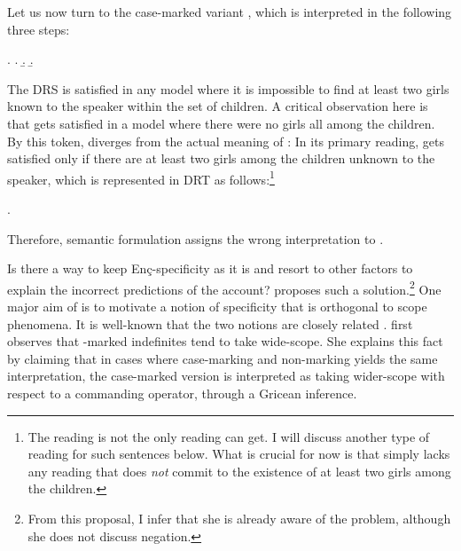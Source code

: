 \documentclass[11pt,a4paper]{article}
\newcommand{\encspec}{Enç-specific}
\begin{document}
Let us now turn to the case-marked variant ,
which is interpreted in the following three steps:

\ex.
\a.
\b.
\b.\label{exencnegaccdrs}

The DRS  is satisfied in any model where it is
impossible to find at least two girls known to the speaker within the
set of children. A critical observation here is that
 gets satisfied in a model where there were no
girls \label{at} all among the children. By this token,
 diverges from the actual meaning of
: In its primary reading,  gets
satisfied only if there are at least two girls among the children
unknown to the speaker, which is represented in DRT as follows:\footnote{The reading
		 is not the only reading 
		can get. I will discuss another type of reading for such
		sentences below. What is crucial for now is that
		 simply lacks any reading that does
\emph{not} commit to the existence of at least two girls among the
children.}


\ex.\label{exencwide}

Therefore,  semantic formulation assigns the wrong
interpretation to .


Is there a way to keep \encspec{ity} as it is and resort to other factors to
explain the incorrect predictions of the account?  proposes such a
solution.\footnote{From this proposal, I infer that she is already
aware of the problem, although she does not discuss negation.} One
major aim of  is to motivate a notion of specificity that
is orthogonal to scope phenomena. It is well-known that the two
notions are closely related .  first observes that
\acc-marked indefinites tend to take wide-scope. She explains this
fact by claiming that in cases where case-marking and non-marking
yields the same interpretation, the case-marked version is interpreted
as taking wider-scope with respect to a commanding operator, through a
Gricean inference.
\end{document}
